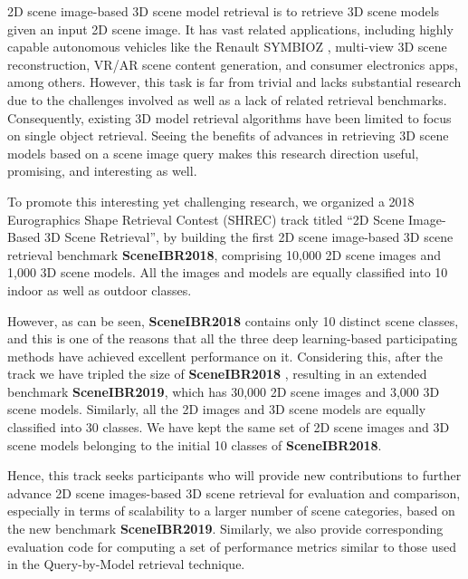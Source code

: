 \documentclass[../main.tex]{subfiles}
\begin{document}
2D scene image-based 3D scene model retrieval is to retrieve 3D scene models given an input 2D scene image. It has vast related applications, including highly capable autonomous vehicles like the Renault SYMBIOZ \cite{Renault} \cite{Youtube}, multi-view 3D scene reconstruction, VR/AR scene content generation, and consumer electronics apps, among others. However, this task is far from trivial and lacks substantial research due to the challenges involved as well as a lack of related retrieval benchmarks. Consequently, existing 3D model retrieval algorithms have been limited to focus on single object retrieval. Seeing the benefits of advances in retrieving 3D scene models based on a scene image query makes this research direction useful, promising, and interesting as well.

To promote this interesting yet challenging research, we organized a 2018 Eurographics Shape Retrieval Contest (SHREC) track \cite{SHREC18-SceneIBR-Track} titled “2D Scene Image-Based 3D Scene Retrieval”, by building the first 2D scene image-based 3D scene retrieval benchmark \textbf{SceneIBR2018}, comprising 10,000 2D scene images and 1,000 3D scene models. All the images and models are equally classified into 10 indoor as well as outdoor classes.

However, as can be seen, \textbf{SceneIBR2018} contains only 10 distinct scene classes, and this is one of the reasons that all the three deep learning-based participating methods have achieved excellent performance on it. Considering this, after the track we have tripled the size of \textbf{SceneIBR2018} \cite{MIPR}, resulting in an extended benchmark \textbf{SceneIBR2019}, which has 30,000 2D scene images and 3,000 3D scene models. Similarly, all the 2D images and 3D scene models are equally classified into 30 classes. We have kept the same set of 2D scene images and 3D scene models belonging to the initial 10 classes of \textbf{SceneIBR2018}.

Hence, this track seeks participants who will provide new contributions to further advance 2D scene images-based 3D scene retrieval for evaluation and comparison, especially in terms of scalability to a larger number of scene categories, based on the new benchmark \textbf{SceneIBR2019}. Similarly, we also provide corresponding evaluation code for computing a set of performance metrics similar to those used in the Query-by-Model retrieval technique.
\end{document}

